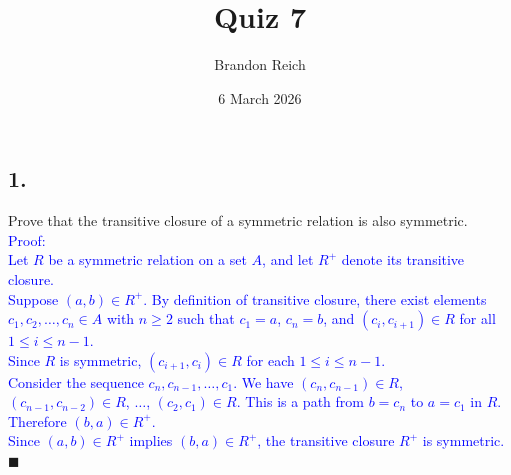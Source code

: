 \documentclass{article}
\title{Quiz 7}
\author{Brandon Reich}
\date{6 March 2026}
\begin{document}
\maketitle

\subsection*{1.}
Prove that the transitive closure of a symmetric relation is also symmetric. \\[1em]
\textcolor{blue}{Proof:} \\[0.5em]
\textcolor{blue}{Let $R$ be a symmetric relation on a set $A$, and let $R^+$ denote its transitive closure.} \\
\textcolor{blue}{Suppose $(a, b) \in R^+$. By definition of transitive closure, there exist elements $c_1, c_2, \ldots, c_n \in A$ with $n \geq 2$ such that $c_1 = a$, $c_n = b$, and $(c_i, c_{i+1}) \in R$ for all $1 \leq i \leq n - 1$.} \\[0.5em]
\textcolor{blue}{Since $R$ is symmetric, $(c_{i+1}, c_i) \in R$ for each $1 \leq i \leq n - 1$.} \\[0.5em]
\textcolor{blue}{Consider the sequence $c_n, c_{n-1}, \ldots, c_1$. We have $(c_n, c_{n-1}) \in R$, $(c_{n-1}, c_{n-2}) \in R$, $\ldots$, $(c_2, c_1) \in R$. This is a path from $b = c_n$ to $a = c_1$ in $R$.} \\[0.5em]
\textcolor{blue}{Therefore $(b, a) \in R^+$.} \\[0.5em]
\textcolor{blue}{Since $(a, b) \in R^+$ implies $(b, a) \in R^+$, the transitive closure $R^+$ is symmetric.} $\blacksquare$
\end{document}
